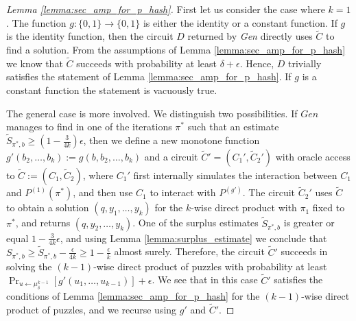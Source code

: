 \begin{proof}[Lemma \ref{lemma:sec_amp_for_p_hash}]
First let us consider the case where $k=1$. The function $g: \{0,1\} \rightarrow \{0,1\}$ is either the identity or a constant function.
If $g$ is the identity function, then the circuit $D$ returned by \textit{Gen} directly uses $\widetilde{C}$ to find a solution.
From the assumptions of Lemma \ref{lemma:sec_amp_for_p_hash} we know that $\widetilde{C}$ succeeds with probability at least
$\delta + \epsilon$. Hence, $D$ trivially satisfies the statement of Lemma \ref{lemma:sec_amp_for_p_hash}.
If $g$ is a constant function the statement is vacuously true.

The general case is more involved. We distinguish two possibilities.
If $Gen$ manages to find in one of the iterations $\pi^*$ such that an estimate
$\widetilde{S}_{\pi^*,b} \geq (1-\frac{3}{4k})\epsilon$, then we define a new monotone function
$g'(b_2, \dots, b_k) := g(b, b_2, \dots, b_k)$ and a circuit $\widetilde{C}' = (C_1', \widetilde{C}_2')$ with oracle access to $\widetilde{C} := (C_1, \widetilde{C}_2)$,
where $C_1'$ first internally simulates the interaction between $C_1$ and $P^{(1)}(\pi^*)$, and then use $C_1$ to interact with $P^{(g')}$.
The circuit $\widetilde{C}_2'$ uses $\widetilde{C}$ to obtain a solution $(q, y_1, \dots, y_k)$ for the $k$-wise direct product with $\pi_1$ fixed to $\pi^*$,
and returns $(q, y_2, \dots, y_k)$.
One of the surplus estimates $\widetilde{S}_{\pi^*, b}$ is greater or equal $1 - \frac{3}{4k}\epsilon$, and using Lemma \ref{lemma:surplus_estimate}
we conclude that $S_{\pi^*,b} \geq \widetilde{S}_{\pi^*, b} - \frac{\epsilon}{4k} \geq 1 - \frac{\epsilon}{k}$ almost surely.
Therefore, the circuit $\widetilde{C}'$ succeeds in solving the $(k-1)$-wise direct product of puzzles with probability
at least $\Pr_{u \leftarrow \mu^{k-1}_{\delta}}[g'(u_1,\dots, u_{k-1} )] + \epsilon$.
We see that in this case $\widetilde{C}'$ satisfies the conditions of Lemma \ref{lemma:sec_amp_for_p_hash}
for the $(k-1)$-wise direct product of puzzles, and we recurse using $g'$ and $\widetilde{C}'$.


\end{proof}
